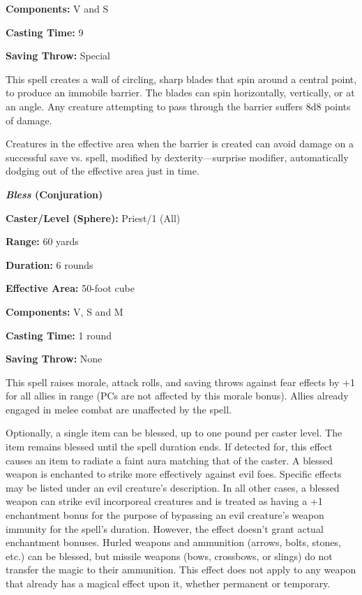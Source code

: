 \begin{multicols}{2}
\begin{minipage}{\columnwidth}
\noindent \textbf{Components:} V and S

\noindent \textbf{Casting Time:} 9

\noindent \textbf{Saving Throw:} Special

\end{minipage}

This spell creates a wall of circling, sharp blades that spin around a central point, to produce an immobile barrier.  The blades can spin horizontally, vertically, or at an angle.  Any creature attempting to pass through the barrier suffers 8d8 points of damage.  

Creatures in the effective area when the barrier is created can avoid damage on a successful save vs. spell, modified by dexterity---surprise modifier, automatically dodging out of the effective area just in time.  

\vspace{1em}

\noindent
\begin{minipage}{\columnwidth}

\noindent \textbf{\textit{Bless} (Conjuration)}

\noindent \textbf{Caster/Level (Sphere):} Priest/1 (All)

\noindent \textbf{Range:} 60 yards

\noindent \textbf{Duration:} 6 rounds

\noindent \textbf{Effective Area:} 50-foot cube

\noindent \textbf{Components:} V, S and M

\noindent \textbf{Casting Time:} 1 round

\noindent \textbf{Saving Throw:} None

\end{minipage}

This spell raises morale, attack rolls, and saving throws against fear effects by +1 for all allies in range (PCs are not affected by this morale bonus).  Allies already engaged in melee combat are unaffected by the spell.  

Optionally, a single item can be blessed, up to one pound per caster level.  The item remains blessed until the spell duration ends.  If detected for, this effect causes an item to radiate a faint aura matching that of the caster.  A blessed weapon is enchanted to strike more effectively against evil foes.  Specific effects may be listed under an evil creature's description.  In all other cases, a blessed weapon can strike evil incorporeal creatures and is treated as having a +1 enchantment bonus for the purpose of bypassing an evil creature's weapon immunity for the spell's duration.  However, the effect doesn't grant actual enchantment bonuses.  Hurled weapons and ammunition (arrows, bolts, stones, etc.) can be blessed, but missile weapons (bows, crossbows, or slings) do not transfer the magic to their ammunition.  This effect does not apply to any weapon that already has a magical effect upon it, whether permanent or temporary.


\end{multicols}
